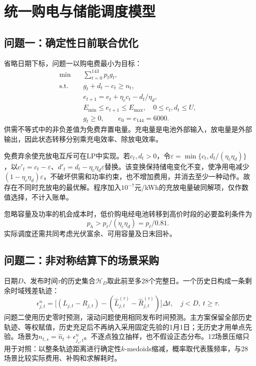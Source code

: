 \section{统一购电与储能调度模型}

\subsection{问题一：确定性日前联合优化}

省略日期下标，问题一以购电费最小为目标：
\begin{align}
 \min\quad &\sum_{t=0}^{143}p_tg_t,\label{eq:q1_objective}\\
 \text{s.t.}\quad &g_t+d_t-c_t\ge n_t,\label{eq:balance}\\
 &e_{t+1}=e_t+\eta_cc_t-d_t/\eta_d,\label{eq:soc}\\
 &E_{\min}\le e_{t+1}\le E_{\max},\quad0\le c_t,d_t\le U,\label{eq:limits}\\
 &g_t\ge0,\qquad e_0=e_{144}=6000.\label{eq:terminal_q1}
\end{align}
供需不等式中的非负差值为免费弃置电量。充电量是电池外部输入，放电量是外部输出，因此状态转移分别乘充电效率、除放电效率。

免费弃余使充放电互斥可在LP中实现。若$c_t,d_t>0$，令$\varepsilon=\min\{c_t,d_t/(\eta_c\eta_d)\}$，以$c'_t=c_t-\varepsilon$、$d'_t=d_t-\eta_c\eta_d\varepsilon$替换。该变换保持储电变化不变，使净用电减少$(1-\eta_c\eta_d)\varepsilon$，不破坏供需和功率约束，也不增加费用，并消去至少一种动作。故存在不同时充放电的最优解。程序加入$10^{-7}$元/kWh的充放电量破同解项，仅作数值选择，不计入账单。

忽略容量及功率的机会成本时，低价购电经电池转移到高价时段的必要盈利条件为
\begin{equation}
 p_h>p_\ell/(\eta_c\eta_d)=p_\ell/0.81.
 \label{eq:arbitrage}
\end{equation}
实际调度还需共同考虑光伏富余、可用容量及日末回补。

\subsection{问题二：非对称结算下的场景采购}

日期$D$、发布时间$\tau$的历史集合$\mathcal H_D$取此前至多28个完整日。一个历史日构成一条剩余时域残差轨迹：
\begin{equation}
 \epsilon^n_{j,t}=\big[(L_{j,t}-R_{j,t})-(\widehat L^{(\tau)}_{j,t}-\widehat R^{(\tau)}_{j,t})\big]\Delta t,
 \quad j<D,\ t\ge\tau.
 \label{eq:residual}
\end{equation}
问题二使用历史零时预测，滚动问题使用相同发布时间预测。主方案保留全部历史轨迹、等权赋值，历史充足后不再纳入采用固定先验的1月1日；无历史才用单点先验。场景为$n_{t,s}=\widehat n_t+\epsilon^n_{j_s,t}$。不逐点独立抽样，也不假设正态分布。12场景压缩只用于对照：以整条轨迹距离进行确定性$k$-medoids缩减，概率取代表簇频率，与28场景比较实际费用、补购和求解耗时。

